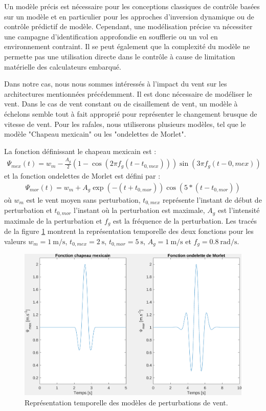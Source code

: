 Un modèle précis est nécessaire pour les conceptions classiques de contrôle basées sur un modèle et en particulier pour les approches d'inversion dynamique ou de contrôle prédictif de modèle. Cependant, une modélisation précise va nécessiter une campagne d'identification approfondie en soufflerie ou un vol en environnement contraint. Il se peut également que la complexité du modèle ne permette pas une utilisation directe dans le contrôle à cause de limitation matérielle des calculateurs embarqué.


Dans notre cas, nous nous sommes intéressés à l'impact du vent sur les architectures mentionnées précédemment. Il est donc nécessaire de modéliser le vent. Dans le cas de vent constant ou de cisaillement de vent, un modèle à échelons semble tout à fait approprié pour représenter le changement brusque de vitesse de vent. 
Pour les rafales, nous utiliserons plusieurs modèles, tel que le modèle "Chapeau mexicain" ou les "ondelettes de Morlet".

La fonction définissant le chapeau mexicain est :
\begin{align}
    \Psi_{mex}(t)= w_{m} - \frac{A_g}{2} \left(1-\cos(2 \pi f_g (t-t_{0,mex}))\right)\sin(3 \pi f_g (t-{0,mex}))
\end{align}
et la fonction ondelettes de Morlet est défini par :
\begin{align}
    \Psi_{mor}(t)=  w_{m} + A_g \exp(-(t+t_{0,mor})) \cos(5*(t-t_{0,mor}))
\end{align}
où $w_{m}$ est le vent moyen sans perturbation, $t_{0,mex}$ représente l'instant de début de perturbation et $t_{0,mor}$ l'instant où la perturbation est maximale, $A_g$ est l'intensité maximale de la perturbation et  $f_g$ est la fréquence de la perturbation. Les tracés de la figure \ref{fig:mexhat} montrent la représentation temporelle des deux fonctions pour les valeurs $w_{m} = \SI{1}{\meter\per\second}$, $t_{0,mex} = \SI{2}{\second}$,  $t_{0,mor} = \SI{5}{\second}$, $A_g = \SI{1}{\meter\per\second}$ et $f_g = \SI{0.8}{\radian\per\second}$.


\begin{figure}[ht!]
    \centerline{
    \includegraphics[trim=0cm 0cm 0cm 0cm,clip,width=0.9\columnwidth]{figures/mex_hat_morlet.png}}
    \caption{Représentation temporelle des modèles de perturbations de vent.}
    \label{fig:mexhat}
\end{figure}


